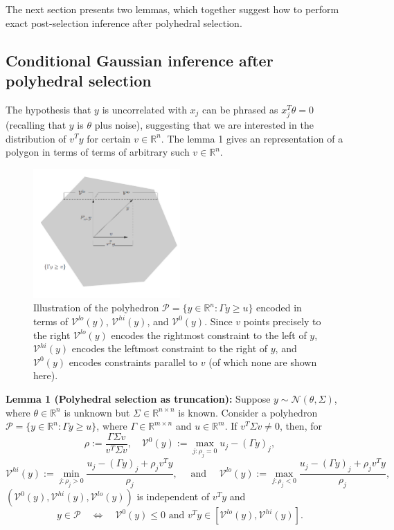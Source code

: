\documentclass{article}
\newcommand{\R}{\mathbb{R}}
\newcommand{\poly}{\mathcal{P}}
\newcommand{\V}{\mathcal{V}}
\begin{document}
The next section presents two lemmas, which together suggest how to perform
exact post-selection inference after polyhedral selection.

\subsection{Conditional Gaussian inference after polyhedral selection}
\label{subsubsec:lemmas}

The hypothesis that $y$ is uncorrelated with $x_j$ can be phrased as
$x_j^T \theta = 0$ (recalling that $y$ is $\theta$ plus noise), suggesting that
we are interested in the distribution of $v^T y$ for certain $v \in \R^n$. The
lemma 1 gives an representation of a polygon in terms of terms of arbitrary
such $v \in \R^n$.

\begin{figure}[ht]
\begin{center}
\includegraphics[width=0.5\textwidth]{figures/polyhedral_testing}
\end{center}
\vspace{-5mm}
\caption{Illustration of the polyhedron
$\poly = \{y \in \R^n : \Gamma y \geq u\}$ encoded in terms of $\V^{lo}(y)$,
$\V^{hi}(y)$, and $\V^0(y)$. Since $v$ points precisely to the right
$\V^{lo}(y)$ encodes the rightmost constraint to the left of $y$, $\V^{hi}(y)$
encodes the leftmost constraint to the right of $y$, and $\V^0(y)$ encodes
constraints parallel to $v$ (of which none are shown here).}
\label{fig:encoded_poly}
\end{figure}

{\bf Lemma 1 (Polyhedral selection as truncation):}
Suppose $y \sim \mathcal{N}(\theta,\Sigma)$, where $\theta \in \R^n$ is unknown
but $\Sigma \in \R^{n \times n}$ is known. Consider a polyhedron
$\poly = \{y \in \R^n : \Gamma y \geq u \}$, where $\Gamma \in \R^{m \times n}$
and $u \in \R^m$. If $v^T \Sigma v \neq 0$, then, for
\[\rho := \frac{\Gamma \Sigma v}{v^T \Sigma v},
    \quad \V^0(y) := \max_{j : \rho_j = 0} u_j - (\Gamma y)_j,\]
\[\V^{hi}(y) := \min_{j : \rho_j > 0}
    \frac{u_j - (\Gamma y)_j + \rho_j v^T y}{\rho_j},
    \quad \mbox{ and } \quad
\V^{lo}(y) := \max_{j : \rho_j < 0}
    \frac{u_j - (\Gamma y)_j + \rho_j v^T y}{\rho_j},\]
$(\V^0(y),\V^{hi}(y),\V^{lo}(y))$ is independent of $v^T y$ and
\[y \in \poly
    \quad \Leftrightarrow \quad
    \V^0(y) \leq 0
    \mbox{ and }
    v^T y \in [\V^{lo}(y), \V^{hi}(y)].\]
\end{document}
